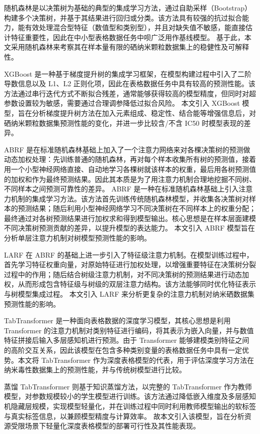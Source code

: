 随机森林是以决策树为基础的典型的集成学习方法，通过自助采样（Bootstrap）构建多个决策树，并基于其结果进行回归或分类。该方法具有较强的抗过拟合能力，能有效处理混合型特征（数值型和类别型），并且对缺失值不敏感，能直接估计特征重要性，因此在中小型表格数据任务中呗广泛用作基线模型。
基于此，本文采用随机森林来考察其在样本量有限的硒纳米颗粒数据集上的稳健性及可解释性。


XGBoost 是一种基于梯度提升树的集成学习框架，在模型构建过程中引入了二阶导数信息以及 L1、L2 正则化项，因此在表格数据任务中具有较高的预测性能。该方法通过串行迭代方式不断拟合残差，通常能够获得较高的模型精度，但同时对超参数设置较为敏感，需要通过合理调参降低过拟合风险。
本文引入 XGBoost 模型，旨在分析梯度提升树方法在加入元素组成、稳定性、结合能等增强信息后，对硒纳米颗粒数据集预测性能的变化，并进一步比较含/不含 IC50 时模型表现的差异。

ABRF 是在标准随机森林基础上加入了一个注意力网络来对各棵决策树的预测做动态加权处理：先训练普通的随机森林，再对每个样本收集所有树的预测值，接着用一个小型神经网络直接、自动地学习各棵树就该样本的权重，最后用各树预测值的加权和作为最终预测结果。因此其本质是为了用注意力机制合理地挖掘不同树、不同样本之间预测可靠性的差异。
ABRF 是一种在标准随机森林基础上引入注意力机制的集成学习方法。该方法首先训练传统随机森林模型，并收集各决策树对样本的预测结果；随后利用小型神经网络学习不同决策树在不同样本上的权重分配；最终通过对各树预测结果进行加权求和得到模型输出。核心思想是在样本层面建模不同决策树预测贡献的差异，以提升模型的表达能力。
本文引入 ABRF 模型旨在分析单层注意力机制对树模型预测性能的影响。


LARF 在 ABRF 的基础上进一步引入了特征级注意力机制。在模型训练过程中，首先学习特征权重向量，对原始特征进行加权处理，以增强重要特征在决策树分裂过程中的作用；随后结合树级注意力机制，对不同决策树的预测结果进行动态加权，从而形成包含特征级与树级的双层注意力结构。该方法能够同时优化特征表示与树模型集成过程。
本文引入 LARF 来分析更复杂的注意力机制对纳米硒数据集预测性能的影响。

TabTransformer 是一种面向表格数据的深度学习模型，其核心思想是利用 Transformer 的注意力机制对类别特征进行编码，将其表示为嵌入向量，并与数值特征拼接后输入多层感知机进行预测。由于 Transformer 能够建模类别特征之间的高阶交互关系，因此该模型在包含多种类别变量的表格数据任务中具有一定优势。本文将 TabTransformer 作为深度表格模型的代表，用于评估深度学习方法在纳米毒性数据集上的预测性能，并与传统树模型进行比较。

蒸馏 TabTransformer 则基于知识蒸馏方法，以完整的 TabTransformer 作为教师模型，对参数规模较小的学生模型进行训练。该方法通过降低嵌入维度及多层感知机隐藏层规模，实现模型轻量化，并在训练过程中同时利用教师模型输出的软标签与真实标签信息，以兼顾模型精度与计算效率。
故本文引入该模型，旨在分析资源受限场景下轻量化深度表格模型的部署可行性及其性能表现。

